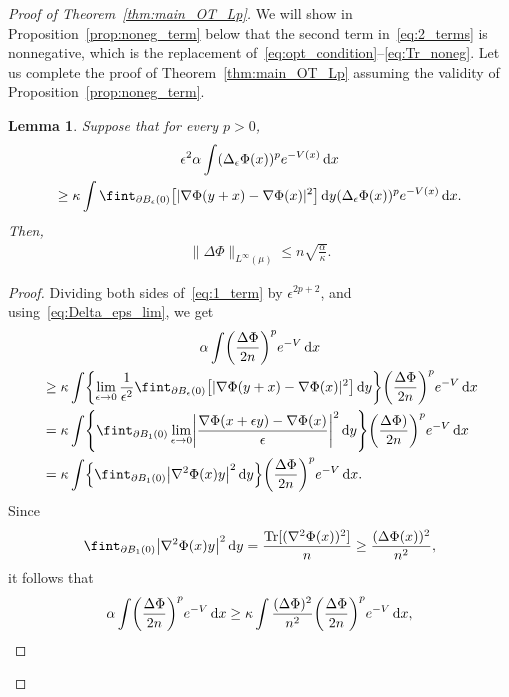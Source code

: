 \documentclass[10pt]{amsart}
\newtheorem{lemm}[theo]{Lemma}\newtheorem{prop}[theo]{Proposition}\newtheorem{coro}[theo]{Corollary}\newtheorem{conj}[theo]{Conjecture}
\theoremstyle{definition}\newtheorem{defi}[theo]{Definition}\newtheorem{rema}[theo]{Remark}\newtheorem{exam}[theo]{Example}\newtheorem{exem}[theo]{Example}\newtheorem{nota}[theo]{Notation}
\DeclareMathOperator{\Tr}{Tr}
\newcommand{\dd}{n}
\newcommand{\source}{\mu}
\newcommand{\lsh}{\alpha}
\newcommand{\lc}{\kappa}
\newcommand*\diff{\mathop{}\!\mathrm{d}}
\newcommand{\OT}{\Phi}
\newcommand{\avgint}{\fint}
\renewcommand*{\to}{\mathchoice{\longrightarrow}{\rightarrow}{\rightarrow}{\rightarrow}}
\let\originalleft\left
\let\originalright\right
\renewcommand{\left}{\mathopen{}\mathclose\bgroup\originalleft}
\renewcommand{\right}{\aftergroup\egroup\originalright}
\begin{document}
\begin{proof}[Proof of Theorem~\ref{thm:main_OT_Lp}]
We will show in Proposition~\ref{prop:noneg_term} below that the second term in~\eqref{eq:2_terms} is nonnegative, which is the replacement of~\eqref{eq:opt_condition}--\eqref{eq:Tr_noneg}. Let us complete the proof of Theorem~\ref{thm:main_OT_Lp} assuming the validity of Proposition~\ref{prop:noneg_term}.
\begin{lemm}\label{lem:_term_to_thm_proof}
Suppose that for every $p>0$,
\begin{multline}\label{eq:1_term}
\epsilon^2 \lsh\int (\Delta_{\epsilon}\OT(x))^p e^{-V(x)}\diff x\\
\ge \lc\int\avgint_{\partial B_{\epsilon}(0)}\left[|\nabla\OT(y+x)-\nabla\OT(x)|^2 \right]\diff y(\Delta_{\epsilon}\OT(x))^p e^{-V(x)}\diff x.
\end{multline}
Then,
\begin{align}\label{eq:infty_bound}
\|\Delta\OT\|_{L^{\infty}(\source)}\le \dd\sqrt{ \frac{\lsh}{\lc}}.
\end{align}
\end{lemm}
\begin{proof}
Dividing both sides of~\eqref{eq:1_term} by $\epsilon^{2p+2}$, and using~\eqref{eq:Delta_eps_lim}, we get
\begin{multline*}
\lsh \int \left(\frac{\Delta \OT}{2\dd}\right)^p e^{-V}\diff x\\
\begin{aligned}
&\ge \lc \int\left\{\lim_{\epsilon\to 0}\frac{1}{\epsilon^2}\avgint_{\partial B_{\epsilon}(0)}\left[|\nabla\OT(y+x)-\nabla\OT(x)|^2 \right]\diff y\right\} \left(\frac{\Delta \OT}{2\dd}\right)^p e^{-V}\diff x\\
&=\lc \int\left\{\avgint_{\partial B_{1}(0)}\lim_{\epsilon\to 0}\left|\frac{\nabla\OT(x+\epsilon y)-\nabla\OT(x)}{\epsilon}\right|^2\diff y\right\} \left(\frac{\Delta \OT)}{2\dd}\right)^p e^{-V}\diff x\\
&=\lc \int\left\{\avgint_{\partial B_{1}(0)}\left| \nabla^2\OT(x)y\right|^2\diff y\right\} \left(\frac{\Delta \OT}{2\dd}\right)^p e^{-V}\diff x.
\end{aligned}
\end{multline*}
Since
\begin{align*}
\avgint_{\partial B_{1}(0)}\left| \nabla^2\OT(x)y\right|^2\diff y=\frac{\Tr[(\nabla^2\OT(x))^2]}{
\dd}\ge \frac{(\Delta \OT(x))^2}{\dd^2},
\end{align*}
it follows that
\[
\lsh\int \left(\frac{\Delta \OT}{2\dd}\right)^p e^{-V}\diff x\ge \lc \int \frac{(\Delta \OT)^2}{\dd^2} \left(\frac{\Delta \OT}{2\dd}\right)^p e^{-V}\diff x,
\]
\end{proof}
\end{proof}
\end{document}

